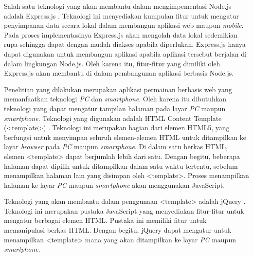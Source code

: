 Salah satu teknologi yang akan membantu dalam mengimpementasi Node.js adalah Express.js \cite{nodeFound:10:expressjsapi}. Teknologi ini menyediakan kumpulan fitur untuk mengatur penyimpanan data secara lokal dalam membangun aplikasi web maupun \textit{mobile}. Pada proses implementasinya Express.js akan mengolah data lokal sedemikian rupa sehingga dapat dengan mudah diakses apabila diperlukan. Express.js hanya dapat digunakan untuk membangun aplikasi apabila aplikasi tersebut berjalan di dalam lingkungan Node.js. Oleh karena itu, fitur-fitur yang dimiliki oleh Express.js akan membantu di dalam pembangunan aplikasi berbasis Node.js.

Penelitian yang dilakukan merupakan aplikasi permainan berbasis web yang memanfaatkan teknologi \textit{PC} dan \textit{smartphone}. Oleh karena itu dibutuhkan teknologi yang dapat mengatur tampilan halaman pada layar \textit{PC} maupun \textit{smartphone}. Teknologi yang digunakan adalah HTML Content Template (<template>) \cite{moz:05:template}. Teknologi ini merupakan bagian dari elemen HTML5, yang berfungsi untuk menyimpan seluruh elemen-elemen HTML untuk ditampilkan ke layar \textit{browser} pada \textit{PC} maupun \textit{smartphone}. Di dalam satu berkas HTML, elemen <template> dapat berjumlah lebih dari satu. Dengan begitu, beberapa halaman dapat dipilih untuk ditampilkan dalam satu waktu tertentu, sebelum menampilkan halaman lain yang disimpan oleh <template>. Proses menampilkan halaman ke layar \textit{PC} maupun \textit{smartphone} akan menggunakan JavaScript.

Teknologi yang akan membantu dalam penggunaan <template> adalah jQuery \cite{jqFound:06:jQueryAPI}. Teknologi ini merupakan pustaka JavaScript yang menyediakan fitur-fitur untuk mengatur berbagai elemen HTML. Pustaka ini memiliki fitur untuk memanipulasi berkas HTML. Dengan begitu, jQuery dapat mengatur untuk menampilkan <template> mana yang akan ditampilkan ke layar \textit{PC} maupun \textit{smartphone}.

